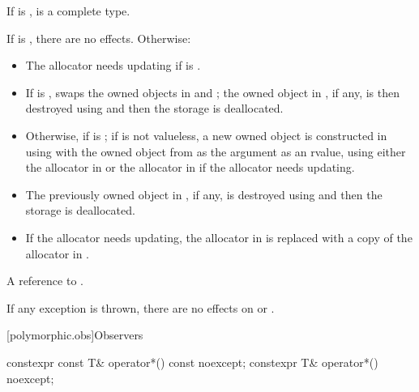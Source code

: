 \begin{itemdescr}
\pnum
\mandates
If  is ,
 is a complete type.

\pnum
\effects
If  is , there are no effects.
Otherwise:

\begin{itemize}
\item
The allocator needs updating if
is .

\item
If  is ,
swaps the owned objects in  and ;
the owned object in , if any,
is then destroyed using  and
then the storage is deallocated.

\item
Otherwise,
if  is ;
if  is not valueless,
a new owned object is constructed in 
using  with
the owned object from  as the argument as an rvalue,
using either the allocator in  or
the allocator in  if the allocator needs updating.

\item
The previously owned object in , if any,
is destroyed using  and
then the storage is deallocated.

\item
If the allocator needs updating,
the allocator in  is replaced with
a copy of the allocator in .
\end{itemize}

\pnum
\returns
A reference to .

\pnum
\remarks
If any exception is thrown,
there are no effects on  or .
\end{itemdescr}

[polymorphic.obs]{Observers}

%
\begin{itemdecl}
constexpr const T& operator*() const noexcept;
constexpr T& operator*() noexcept;
\end{itemdecl}

